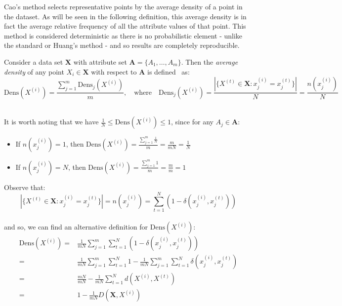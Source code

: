 Cao's method selects representative points by the average density of a point in
the dataset. As will be seen in the following definition, this average density 
is in fact the average relative frequency of all the attribute values of that 
point. This method is considered deterministic as there is no probabilistic 
element - unlike the standard or Huang's method - and so results are completely
reproducible.\\

\begin{definition}\label{def:density}	
    Consider a data set \(\textbf{X}\) with attribute set \(\textbf{A} = 
    \{A_1, \ldots, A_m\}\). Then the \emph{average density} of any point 
    \(X_i \in \textbf{X}\) with respect to \(\textbf{A}\) is 
    defined~\cite{Cao09} as:
	\[
	    \text{Dens}(X^{(i)}) = \frac{\sum_{j=1}^m \text{Dens}_{j}(X^{(i)})}{m}, 
        \quad \text{where} \quad \text{Dens}_{j}(X^{(i)}) = \frac{|\{X^{(t)} \in 
        \textbf{X} : x_j^{(i)} = x_j^{(t)}\}|}{N} = \frac{n(x_j^{(i)})}{N}
	\]\\
\end{definition}

\begin{remark}
    It is worth noting that we have \(\frac{1}{N} \leq \text{Dens}(X^{(i)})
    \leq 1\), since for any \(A_j \in \textbf{A}\):		
	\begin{itemize}	
        \item If \(n(x_j^{(i)}) = 1\), then \(\text{Dens}(X^{(i)}) = 
			\frac{\sum_{j=1}^m \frac{1}{N}}{m} = \frac{m}{mN} = \frac{1}{N}\)
        \item If \(n(x_j^{(i)}) = N\), then \(\text{Dens}(X^{(i)}) = 
            \frac{\sum_{j=1}^m 1}{m} = \frac{m}{m} = 1\)\\
	\end{itemize}
\end{remark}

\noindent Observe that:
\[
	|\{X^{(t)} \in \textbf{X} : x_j^{(i)} = x_j^{(t)}\}| = n(x_j^{(i)}) = 
	\sum_{t=1}^N (1 - \delta(x_j^{(i)}, x_j^{(t)}))
\]\\

and so, we can find an alternative definition for \(\text{Dens}(X^{(i)})\):
\begin{equation}
\begin{aligned}
    \text{Dens}(X^{(i)}) = {} & {} \frac{1}{mN} \sum_{j=1}^m \sum_{t=1}^N 
                         (1 - \delta(x_j^{(i)}, x_j^{(t)}))
    \\
			             = {} & {} \frac{1}{mN} \sum_{j=1}^m \sum_{t=1}^N 1 - 
                         \frac{1}{mN} \sum_{j=1}^m \sum_{t=1}^N 
                         \delta(x_j^{(i)}, x_j^{(t)})
    \\
                         = {} & {} \frac{mN}{mN} - \frac{1}{mN} \sum_{t=1}^N 
                         d(X^{(i)}, X^{(t)})
    \\
			             = {} & {} 1 - \frac{1}{mN} D(\textbf{X}, X^{(i)})
\end{aligned}
\end{equation}\\

